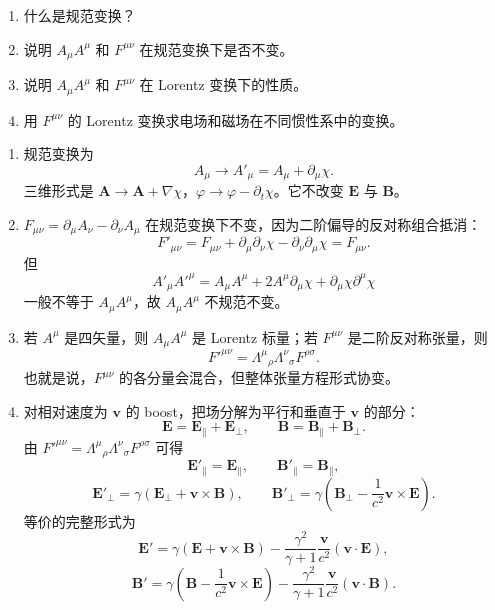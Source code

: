 

\begin{question}
\begin{enumerate}
  \item 什么是规范变换？
  \item 说明 $A_\mu A^\mu$ 和 $F^{\mu\nu}$ 在规范变换下是否不变。
  \item 说明 $A_\mu A^\mu$ 和 $F^{\mu\nu}$ 在 Lorentz 变换下的性质。
  \item 用 $F^{\mu\nu}$ 的 Lorentz 变换求电场和磁场在不同惯性系中的变换。
\end{enumerate}
\begin{solution}
\begin{enumerate}
  \item 规范变换为
  \[
    A_\mu\to A'_\mu=A_\mu+\partial_\mu\chi .
  \]
  三维形式是 $\mathbf A\to\mathbf A+\nabla\chi$，$\varphi\to\varphi-\partial_t\chi$。它不改变 $\mathbf E$ 与 $\mathbf B$。

  \item $F_{\mu\nu}=\partial_\mu A_\nu-\partial_\nu A_\mu$ 在规范变换下不变，因为二阶偏导的反对称组合抵消：
  \[
    F'_{\mu\nu}=F_{\mu\nu}+\partial_\mu\partial_\nu\chi-\partial_\nu\partial_\mu\chi=F_{\mu\nu} .
  \]
  但
  \[
    A'_\mu A'^{\mu}=A_\mu A^\mu+2A^\mu\partial_\mu\chi+
    \partial_\mu\chi\partial^\mu\chi
  \]
  一般不等于 $A_\mu A^\mu$，故 $A_\mu A^\mu$ 不规范不变。

  \item 若 $A^\mu$ 是四矢量，则 $A_\mu A^\mu$ 是 Lorentz 标量；若 $F^{\mu\nu}$ 是二阶反对称张量，则
  \[
    F'^{\mu\nu}=\Lambda^\mu{}_{\rho}\Lambda^\nu{}_{\sigma}F^{\rho\sigma} .
  \]
  也就是说，$F^{\mu\nu}$ 的各分量会混合，但整体张量方程形式协变。

  \item 对相对速度为 $\mathbf v$ 的 boost，把场分解为平行和垂直于 $\mathbf v$ 的部分：
  \[
    \mathbf E=\mathbf E_\parallel+\mathbf E_\perp,
    \qquad
    \mathbf B=\mathbf B_\parallel+\mathbf B_\perp .
  \]
  由 $F'^{\mu\nu}=\Lambda^\mu{}_{\rho}\Lambda^\nu{}_{\sigma}F^{\rho\sigma}$ 可得
  \[
    \boxed{\mathbf E'_\parallel=\mathbf E_\parallel,
    \qquad
    \mathbf B'_\parallel=\mathbf B_\parallel,}
  \]
  \[
    \boxed{\mathbf E'_\perp=\gamma(\mathbf E_\perp+\mathbf v\times\mathbf B),
    \qquad
    \mathbf B'_\perp=\gamma\left(\mathbf B_\perp-\frac{1}{c^2}\mathbf v\times\mathbf E\right)} .
  \]
  等价的完整形式为
  \[
    \mathbf E'=\gamma(\mathbf E+\mathbf v\times\mathbf B)
    -\frac{\gamma^2}{\gamma+1}\frac{\mathbf v}{c^2}(\mathbf v\cdot\mathbf E),
  \]
  \[
    \mathbf B'=\gamma\left(\mathbf B-\frac1{c^2}\mathbf v\times\mathbf E\right)
    -\frac{\gamma^2}{\gamma+1}\frac{\mathbf v}{c^2}(\mathbf v\cdot\mathbf B) .
  \]
\end{enumerate}
\end{solution}
\end{question}

